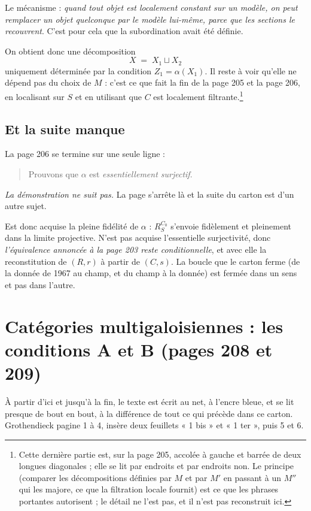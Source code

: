 \documentclass[11pt,a4paper]{article}
\begin{document}
Le mécanisme : \emph{quand tout objet est localement
constant sur un modèle, on peut remplacer un objet quelconque par le modèle
lui-même, parce que les sections le recouvrent}. C'est pour cela que
la subordination avait été définie.

On obtient donc une décomposition
\[
  X \;=\; X_{1} \sqcup X_{2}
\]
uniquement déterminée par la condition $Z_{1} = \alpha(X_{1})$. Il reste à voir
qu'elle ne dépend pas du choix de $M$ : c'est ce que fait la fin de la page 205
et la page 206, en localisant sur $S$ et en utilisant que $C$ est localement
filtrante.\footnote{Cette dernière partie est, sur la page 205, accolée à
gauche et barrée de deux longues diagonales ; elle se lit par endroits et par
endroits non. Le principe (comparer les décompositions définies par $M$ et
par $M'$ en passant à un $M''$ qui les majore, ce que la filtration locale
fournit) est ce que les phrases portantes autorisent ; le détail ne l'est
pas, et il n'est pas reconstruit ici.}

\subsection*{Et la suite manque}

La page 206 se termine sur une seule ligne :

\begin{quote}
Prouvons que $\alpha$ est \emph{essentiellement surjectif}.
\end{quote}

\emph{La démonstration ne suit pas.} La page s'arrête là et la suite du carton
est d'un autre sujet.

Est donc acquise la
pleine fidélité de $\alpha$ : $R_{S}^{C_{0}}$ s'envoie fidèlement et
pleinement dans la limite projective. N'est pas acquise l'essentielle
surjectivité, donc \emph{l'équivalence annoncée à la page 203 reste
conditionnelle}, et avec elle la reconstitution de $(R, r)$ à partir de
$(C, s)$. La boucle que le carton ferme (de la donnée de 1967 au champ, et
du champ à la donnée) est fermée dans un sens et pas dans l'autre.

\section*{Catégories multigaloisiennes : les conditions A et B (pages 208 et 209)}

À partir d'ici et jusqu'à la fin, le texte est écrit au net, à l'encre bleue,
et se lit presque de bout en bout, à la différence de tout ce qui précède
dans ce carton. Grothendieck pagine 1 à 4, insère deux feuillets « 1 bis » et
« 1 ter », puis 5 et 6.
\end{document}
